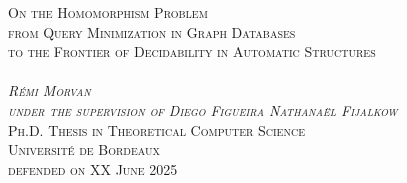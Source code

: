 \begin{titlepage}
\begin{center}
  \Huge\scshape{%
  On the Homomorphism Problem}\\[.5cm]
  \Large\scshape{%
  from Query Minimization in Graph Databases\\[.2cm]to the Frontier of Decidability in Automatic Structures}\\
  \vspace{5cm}
  \\
  \vfill
  \normalfont%
  \huge{}\emph{Rémi Morvan}\\
  \large\emph{under the supervision of 
  Diego Figueira {\color{maincolor}\fancyand} Nathanaël Fijalkow}\\[1cm]
  \normalfont\Large\scshape
  Ph.D. Thesis in Theoretical Computer Science\\
  \textcolor{maincolor}{Université de Bordeaux}\\
  defended on XX June 2025
\end{center}
\end{titlepage}
\restoregeometry